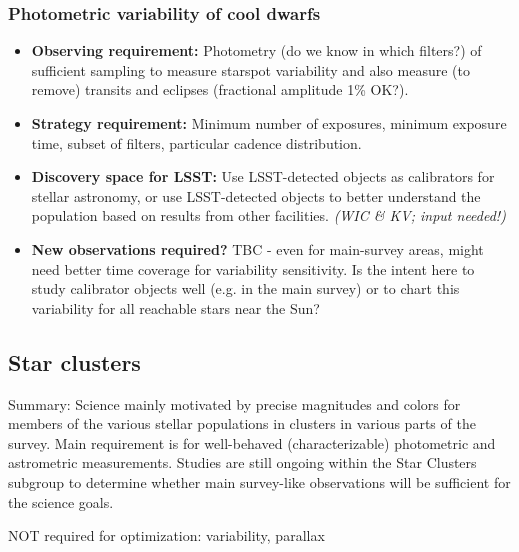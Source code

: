 \subsubsection{Photometric variability of cool dwarfs}
\vspace{-2mm}
\begin{itemize}
\item {\bf Observing requirement:} Photometry (do we know in which filters?) of sufficient sampling to measure starspot variability and also measure (to remove) transits and eclipses (fractional amplitude 1\% OK?). \vspace{-2mm}
\item {\bf Strategy requirement:} Minimum number of exposures, minimum exposure time, subset of filters, particular cadence distribution. \vspace{-2mm}
\item {\bf Discovery space for LSST:} Use LSST-detected objects as calibrators for stellar astronomy, or use LSST-detected objects to better understand the population based on results from other facilities. {\it (WIC \& KV; input needed!)} \vspace{-2mm}
\item {\bf New observations required?} TBC - even for main-survey areas, might need better time coverage for variability sensitivity. Is the intent here to study calibrator objects well (e.g. in the main survey) or to chart this variability for all reachable stars near the Sun?
\end{itemize}

\subsection{Star clusters}

Summary: Science mainly motivated by precise magnitudes and colors for
members of the various stellar populations in clusters in various
parts of the survey. Main requirement is for well-behaved
(characterizable) photometric and astrometric measurements. Studies
are still ongoing within the Star Clusters subgroup to determine
whether main survey-like observations will be sufficient for the science
goals.

NOT required for optimization: variability, parallax




